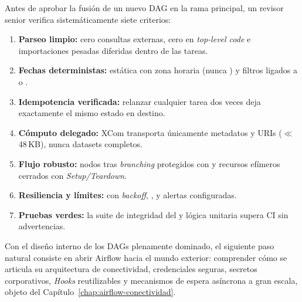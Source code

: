\begin{examplebox}
Antes de aprobar la fusión de un nuevo DAG en la rama principal, un revisor senior verifica sistemáticamente siete criterios:
\begin{enumerate}
  \item \textbf{Parseo limpio:} cero consultas externas, cero  en \textit{top-level code} e importaciones pesadas diferidas dentro de las tareas.
  \item \textbf{Fechas deterministas:}  estática con zona horaria (nunca ) y filtros ligados a  o .
  \item \textbf{Idempotencia verificada:} relanzar cualquier tarea dos veces deja exactamente el mismo estado en destino.
  \item \textbf{Cómputo delegado:} XCom transporta únicamente metadatos y URIs ($\ll$ 48\,KB), nunca datasets completos.
  \item \textbf{Flujo robusto:} nodos tras \textit{branching} protegidos con  y recursos efímeros cerrados con \textit{Setup/Teardown}.
  \item \textbf{Resiliencia y límites:}  con \textit{backoff}, ,  y alertas configuradas.
  \item \textbf{Pruebas verdes:} la suite  de integridad del  y lógica unitaria supera CI sin advertencias.
\end{enumerate}
\end{examplebox}

Con el diseño interno de los DAGs plenamente dominado, el siguiente paso natural consiste en abrir Airflow hacia el mundo exterior: comprender cómo se articula su arquitectura de conectividad, credenciales seguras, secretos corporativos, \textit{Hooks} reutilizables y mecanismos de espera asíncrona a gran escala, objeto del Capítulo~\ref{chap:airflow-conectividad}.
